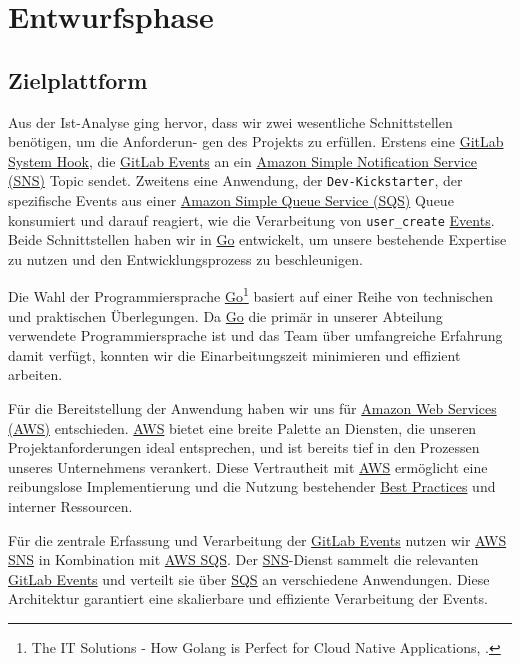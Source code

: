\section{Entwurfsphase} 
\label{sec:Entwurfsphase}

\subsection{Zielplattform}
\label{sec:Zielplattform}

Aus der Ist-Analyse ging hervor, dass wir zwei wesentliche Schnittstellen benötigen, um die Anforderun-
gen des Projekts zu erfüllen. Erstens eine \hyperlink{GitLabSystemhooks}{\textcolor{AOBlau}{GitLab System Hook}}, die \hyperlink{GitLabEvent}{\textcolor{AOBlau}{GitLab Events}} an ein \hyperlink{SNS}{\textcolor{AOBlau}{Amazon Simple Notification Service (SNS)}} Topic sendet. Zweitens eine Anwendung, der \texttt{Dev-Kickstarter}, der spezifische Events aus einer \hyperlink{SQS}{\textcolor{AOBlau}{Amazon Simple Queue Service (SQS)}} Queue konsumiert und darauf reagiert, wie die Verarbeitung von \texttt{user\_create} \hyperlink{GitLabEvent}{\textcolor{AOBlau}{Events}}. Beide Schnittstellen haben wir in \hyperlink{Go}{\textcolor{AOBlau}{Go}} entwickelt, um unsere bestehende Expertise zu nutzen und den Entwicklungsprozess zu beschleunigen.

Die Wahl der Programmiersprache \hyperlink{Go}{\textcolor{AOBlau}{Go}}\footnote{The IT Solutions - How Golang is Perfect for Cloud Native Applications, \cite{Go}.} basiert auf einer Reihe von technischen und praktischen Überlegungen. Da \hyperlink{Go}{\textcolor{AOBlau}{Go}} die primär in unserer Abteilung verwendete Programmiersprache ist und das Team über umfangreiche Erfahrung damit verfügt, konnten wir die Einarbeitungszeit minimieren und effizient arbeiten.

Für die Bereitstellung der Anwendung haben wir uns für \hyperlink{AWS}{\textcolor{AOBlau}{Amazon Web Services (AWS)}} entschieden. \hyperlink{AWS}{\textcolor{AOBlau}{AWS}} bietet eine breite Palette an Diensten, die unseren Projektanforderungen ideal entsprechen, und ist bereits tief in den Prozessen unseres Unternehmens verankert. Diese Vertrautheit mit \hyperlink{AWS}{\textcolor{AOBlau}{AWS}} ermöglicht eine reibungslose Implementierung und die Nutzung bestehender \hyperlink{BestPractices}{\textcolor{AOBlau}{Best Practices}} und interner Ressourcen.

Für die zentrale Erfassung und Verarbeitung der \hyperlink{GitLabEvent}{\textcolor{AOBlau}{GitLab Events}} nutzen wir \hyperlink{SNS}{\textcolor{AOBlau}{AWS SNS}} in Kombination mit \hyperlink{SQS}{\textcolor{AOBlau}{AWS SQS}}. Der \hyperlink{SNS}{\textcolor{AOBlau}{SNS}}-Dienst sammelt die relevanten \hyperlink{GitLabEvent}{\textcolor{AOBlau}{GitLab Events}} und verteilt sie über \hyperlink{SQS}{\textcolor{AOBlau}{SQS}} an verschiedene Anwendungen. Diese Architektur garantiert eine skalierbare und effiziente Verarbeitung der Events.

